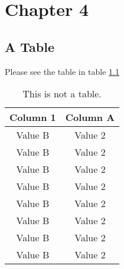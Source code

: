 \pagestyle{fancy}

\chapter{Chapter 4}


\section{A Table}

Please see the table in table \ref{tab:first_table}

\begin{table}[b]
\begin{center}
\begin{tabular}{c|c}
Column 1 & Column A\\
\hline
Value B & Value 2 \\
Value B & Value 2 \\
Value B & Value 2 \\
Value B & Value 2 \\
Value B & Value 2 \\
Value B & Value 2 \\
Value B & Value 2 \\
Value B & Value 2 \\
\end{tabular}
\caption[My first table]{This is not a table.}
\label{tab:first_table}
\end{center}
\end{table}
